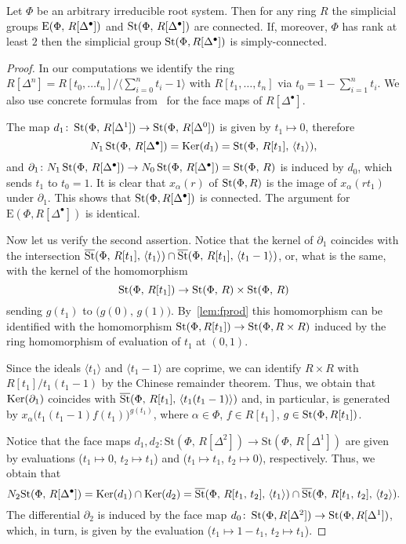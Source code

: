 \documentclass[oneside, 11pt]{amsart} \pdfoutput=1
\begin{document}
\begin{prop}\label{prop:pi1-StDelta} Let $\Phi$ be an arbitrary irreducible root system. Then for any ring $R$ the simplicial groups $\mathrm{E}(\Phi,\,R[\Delta^\bullet])$ and $\mathop{\mathrm{St}}\nolimits(\Phi,\,R[\Delta^\bullet])$ are connected. If, moreover, $\Phi$ has rank at least $2$ then the simplicial group $\mathop{\mathrm{St}}\nolimits(\Phi, R[\Delta^\bullet])$ is simply-connected. \end{prop}
\begin{proof}
In our computations we identify the ring $R[\Delta^n] = R[t_0,\ldots t_n]/\langle \sum_{i=0}^n t_i -1 \rangle$ with $R[t_1, \ldots, t_n]$ via $t_0 = 1 - \sum_{i=1}^n t_i$. We also use concrete formulas from~\cite{Jar83} for the face maps of $R[\Delta^\bullet]$.

The map $d_1\colon\mathop{\mathrm{St}}\nolimits(\Phi,\,R[\Delta^1])\rightarrow\mathop{\mathrm{St}}\nolimits(\Phi,\,R[\Delta^0])$ is given by $t_1\mapsto0$, therefore \[N_1\mathop{\mathrm{St}}\nolimits(\Phi,\,R[\Delta^\bullet])=\mathop{\mathrm{Ker}}\nolimits(d_1)=\mathop{\mathrm{St}}\nolimits(\Phi,\,R[t_1],\,\langle t_1\rangle),\]
and $\partial_1\colon N_1\mathop{\mathrm{St}}\nolimits(\Phi,\,R[\Delta^\bullet])\rightarrow N_0\mathop{\mathrm{St}}\nolimits(\Phi,\,R[\Delta^\bullet])=\mathop{\mathrm{St}}\nolimits(\Phi,\,R)$ is induced by $d_0$, which sends $t_1$ to $t_0=1$. 
It is clear that $x_\alpha(r)$ of $\mathop{\mathrm{St}}\nolimits(\Phi, R)$ is the image of $x_\alpha(rt_1)$ under $\partial_1$.
This shows that $\mathop{\mathrm{St}}\nolimits(\Phi, R[\Delta^\bullet])$ is connected. The argument for $\mathrm{E}(\Phi, R[\Delta^\bullet])$ is identical.

Now let us verify the second assertion. Notice that the kernel of $\partial_1$ coincides with the intersection $\overline{\mathop{\mathrm{St}}\nolimits}(\Phi,\,R[t_1],\,\langle t_1\rangle)\cap\overline{\mathop{\mathrm{St}}\nolimits}(\Phi,\,R[t_1],\,\langle t_1-1 \rangle )$, or, what is the same, with the kernel of the homomorphism
\[\mathop{\mathrm{St}}\nolimits(\Phi,\,R[t_1])\rightarrow\mathop{\mathrm{St}}\nolimits(\Phi,\,R)\times\mathop{\mathrm{St}}\nolimits(\Phi,\,R)\]
sending $g(t_1)$ to $\big(g(0),\,g(1)\big)$. By~\cref{lem:fprod} this homomorphism can be identified with the homomorphism $\mathop{\mathrm{St}}\nolimits(\Phi, R[t_1]) \to \mathop{\mathrm{St}}\nolimits(\Phi, R\times R)$ induced by the ring homomorphism of evaluation of $t_1$ at $(0, 1)$.

Since the ideals $\langle t_1 \rangle$ and $\langle t_1-1 \rangle$ are coprime, we can identify $R\times R$ with $R[t_1]/t_1(t_1-1)$ by the Chinese remainder theorem. Thus, we obtain that $\mathop{\mathrm{Ker}}\nolimits(\partial_1)$ coincides with $\overline{\mathop{\mathrm{St}}\nolimits}(\Phi,\,R[t_1],\,\langle t_1(t_1-1) \rangle)$ and, in particular, is generated by $x_\alpha\big(t_1(t_1-1)f(t_1)\big)^{g(t_1)}$, where $\alpha \in \Phi$, $f\in R[t_1]$, $g \in \mathop{\mathrm{St}}\nolimits(\Phi, R[t_1])$.

Notice that the face maps $d_1, d_2\colon\mathrm{St}(\Phi,\,R[\Delta^2])\rightarrow\mathrm{St}(\Phi,\,R[\Delta^1])$ are given by evaluations ($t_1\mapsto0$, $t_2\mapsto t_1$) and ($t_1\mapsto t_1$, $t_2\mapsto0$), respectively. Thus, we obtain that \[N_2\mathrm{St}(\Phi,\,R[\Delta^\bullet])=\mathop{\mathrm{Ker}}\nolimits(d_1)\cap\mathop{\mathrm{Ker}}\nolimits(d_2)=\overline{\mathop{\mathrm{St}}\nolimits}(\Phi,\,R[t_1,\,t_2],\,\langle t_1\rangle )\cap\overline{\mathop{\mathrm{St}}\nolimits}(\Phi,\,R[t_1,\,t_2],\,\langle t_2\rangle).\]
The differential $\partial_2$ is induced by the face map $d_0 \colon \mathop{\mathrm{St}}\nolimits(\Phi, R[\Delta^2]) \to \mathop{\mathrm{St}}\nolimits(\Phi, R[\Delta^1])$, which, in turn, is given by the evaluation ($t_1 \mapsto 1-t_1$, $t_2 \mapsto t_1$). 


\end{proof}
\end{document}

